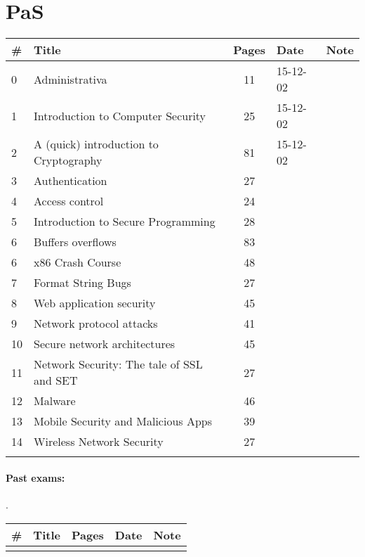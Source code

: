 \documentclass[a4paper,12pt]{article} %
\begin{document}
\section{PaS}
\begin{tabularx}{\textwidth}{|l|X|c|l|c|}
	\hline
	\# & Title & Pages & Date & Note \\
	\hline
	0 & Administrativa & 11 & 15-12-02 &  \\
	\hline
	1 & Introduction to Computer Security & 25 & 15-12-02 &  \\
	\hline
	2 & A (quick) introduction to Cryptography & 81 & 15-12-02 &  \\
	\hline
	3 & Authentication & 27 &  &  \\
	\hline
	4 & Access control & 24 &  &  \\
	\hline
	5 & Introduction to Secure Programming & 28 &  &  \\
	\hline
	6 & Buffers overflows & 83 &  &  \\
	\hline
	6 & x86 Crash Course & 48 &  &  \\
	\hline
	7 & Format String Bugs & 27 &  &  \\
	\hline
	8 & Web application security & 45 &  &  \\
	\hline
	9 & Network protocol attacks & 41 &  &  \\
	\hline
	10 & Secure network architectures & 45 &  &  \\
	\hline
	11 & Network Security: The tale of SSL and SET & 27 &  &  \\
	\hline
	12 & Malware & 46 &  &  \\
	\hline
	13 & Mobile Security and Malicious Apps & 39 &  &  \\
	\hline
	14 & Wireless Network Security & 27 &  &  \\
	\hline
	&  &  &  &  \\
	\hline
\end{tabularx}

\paragraph{Past exams:}.\\
\begin{tabularx}{\textwidth}{|l|X|c|l|c|}
	\hline
	\# & Title & Pages & Date & Note \\
	\hline
	&  &  &  &  \\
	\hline
\end{tabularx}

\newpage
\end{document}
